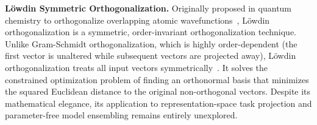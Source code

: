 \textbf{L{\"o}wdin Symmetric Orthogonalization.} Originally proposed in quantum chemistry to orthogonalize overlapping atomic wavefunctions~\cite{lowdin1950non}, L{\"o}wdin orthogonalization is a symmetric, order-invariant orthogonalization technique. Unlike Gram-Schmidt orthogonalization, which is highly order-dependent (the first vector is unaltered while subsequent vectors are projected away), L{\"o}wdin orthogonalization treats all input vectors symmetrically~\cite{soderstrom1974theory}. It solves the constrained optimization problem of finding an orthonormal basis that minimizes the squared Euclidean distance to the original non-orthogonal vectors. Despite its mathematical elegance, its application to representation-space task projection and parameter-free model ensembling remains entirely unexplored.
